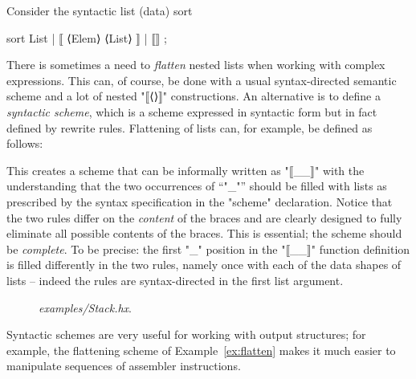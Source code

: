 \documentclass[11pt]{article} %
\newenvironment{figureunit}[1][]{\def\figureunitcaption{#1}}{\figureunitcaption}
\renewenvironment{figureunit}[1][]{\def\thefigureunitcaption{#1}%
  \begin{lrbox}{\savedfigureunit}\begin{minipage}{\linewidth}}%
{\thefigureunitcaption\vspace{1ex}\end{minipage}\end{lrbox}%
  \colorbox{blue!10}{\usebox{\savedfigureunit}}}
\begin{document}
\begin{example}\label{ex:flatten}
  Consider the syntactic list (data) sort
  \begin{hacs}[xleftmargin=\parindent,xrightmargin=\parindent]
sort List | ⟦ ⟨Elem⟩ ⟨List⟩ ⟧ | ⟦⟧ ;
  \end{hacs}
  There is sometimes a need to \emph{flatten} nested lists when working with complex expressions.
  This can, of course, be done with a usual syntax-directed semantic scheme and a lot of nested
  "⟦⟨⟩⟧" constructions. An alternative is to define a \emph{syntactic scheme}, which is a scheme
  expressed in syntactic form but in fact defined by rewrite rules. Flattening of lists can, for
  example, be defined as follows:
  This creates a scheme that can be informally written as "⟦{_}_⟧" with the understanding that the
  two occurrences of ``"_"'' should be filled with lists as prescribed by the syntax specification
  in the "scheme" declaration. Notice that the two rules differ on the \emph{content} of the braces
  and are clearly designed to fully eliminate all possible contents of the braces. This is
  essential; the scheme should be \emph{complete}. To be precise: the first "_" position in the
  "⟦{_}_⟧" function definition is filled differently in the two rules, namely once with each of the
  data shapes of lists -- indeed the rules are syntax-directed in the first list argument.
\end{example}

\begin{figure}[p]
  \begin{figureunit}[
      \caption{\emph{examples/Stack.hx}.}
      \label{fig:stack}
    ]
  \end{figureunit}
\end{figure}

Syntactic schemes are very useful for working with output structures; for example, the flattening
scheme of Example~\ref{ex:flatten} makes it much easier to manipulate sequences of assembler
instructions.
\end{document}
